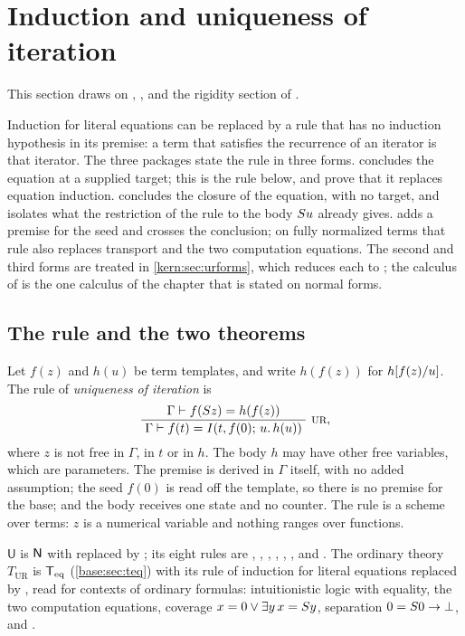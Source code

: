 \section{Induction and uniqueness of iteration}
\label{kern:sec:uniq}

This section draws on , ,
 and the rigidity section of .

Induction for literal equations can be replaced by a rule that has no
induction hypothesis in its premise: a term that satisfies the recurrence of
an iterator is that iterator.  The three packages state the rule in three
forms.   concludes the equation at a supplied target;
this is the rule  below, and
 prove that it replaces equation
induction.   concludes the closure of the equation, with
no target, and isolates what the restriction of the rule to the body
$S u$ already gives.   adds a premise for the
seed and crosses the conclusion; on fully normalized terms that rule also
replaces transport and the two computation equations.  The second and third
forms are treated in \cref{kern:sec:urforms}, which reduces each to
; the calculus of  is the one calculus
of the chapter that is stated on normal forms.

\subsection{The rule and the two theorems}
\label{kern:sec:ur}

Let $f(z)$ and $h(u)$ be term templates, and write $h(f(z))$ for
$h[f(z)/u]$.  The rule of \emph{uniqueness of iteration} is
\[
 \infrule{\Gamma\proves f(\Suc z)=h(f(z))}
         {\Gamma\proves f(t)=\It{t}{f(0)}{u}{h(u)}}\ \rulename{UR},
\]
where $z$ is not free in $\Gamma$, in $t$ or in $h$.  The body $h$ may have
other free variables, which are parameters.  The premise is derived in
$\Gamma$ itself, with no added assumption; the seed $f(0)$ is read off the
template, so there is no premise for the base; and the body receives one
state and no counter.  The rule is a scheme over terms: $z$ is a numerical
variable and nothing ranges over functions.

\begin{definition}
\label{kern:def:U}
$\mathsf{U}$ is $\mathsf{N}$ with  replaced by ; its
eight rules are , , , ,
, ,  and .  The ordinary
theory $T_{\mathrm{UR}}$ is $\mathsf{T}_{\mathrm{eq}}$ (\cref{base:sec:teq}) with its rule of
induction for literal equations replaced by , read for
contexts of ordinary formulas: intuitionistic logic with equality, the two
computation equations, coverage $x=0\vee\exists y\,x=S y$, separation
$0=S 0\to\bot$, and .
\end{definition}

